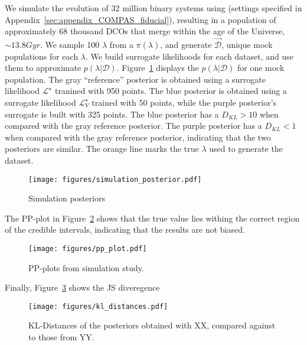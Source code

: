 \documentclass[twocolumn]{aastex631}
\begin{document}
We simulate the evolution of 32 million binary systems using \COMPAS (settings specified in Appendix~\ref{sec:appendix_COMPAS_fiducial}), resulting in a population of approximately 68 thousand DCOs that merge within the age of the Universe, $\sim13.8\unit{Gyr}$. 
We sample 100 $\lambda$ from a $\pi(\lambda)$, and generate $\vec{\mathcal{D}}$, unique mock \COMPAS populations for each $\lambda$.
We build surrogate likelihoods for each dataset, and use them to approximate $p(\lambda|\mathcal{D})$.
Figure~\ref{fig:simulation_posterior} displays the $p(\lambda|\mathcal{D})$ for one mock population.
The gray ``reference'' posterior is obtained using a surrogate likelihood $\mathcal{L}^{\star}$ tranined with 950 points.
The blue posterior is obtained using a surrogate likelihood $\mathcal{L}^{\star}_V$ trained with 50 points, while the purple posterior's surrogate is built with 325 points. 
The blue posterior has a $D_{KL}>10$ when compared with the gray reference posterior. 
The purple  posterior has a $D_{KL}<1$ when compared with the gray reference posterior, indicating that the two posteriors are similar. 
The orange line marks the true $\lambda$ used to generate the dataset. 
\begin{figure}[ht!]
    \begin{centering}
        \texttt{[image: figures/simulation\_posterior.pdf]}
        \caption{
            Simulation posteriors
        }
        \label{fig:simulation_posterior}
    \end{centering}
\end{figure}


The PP-plot in Figure~\ref{fig:pp_plot} shows that the true value lies withing the correct region of the credible intervals, indicating that the results are not biased.
\begin{figure}[ht!]
    \begin{centering}
        \texttt{[image: figures/pp\_plot.pdf]}
        \caption{
            PP-plots from simulation study.
        }
        \label{fig:pp_plot}
    \end{centering}
\end{figure}


Finally, Figure~\ref{fig:kl_distances} shows the JS diveregence 

\begin{figure}[ht!]
    \begin{centering}
        \texttt{[image: figures/kl\_distances.pdf]}
        \caption{
            KL-Distances of the posteriors obtained with XX, compared against to those from YY.
        }
        \label{fig:kl_distances}
    \end{centering}
\end{figure}
\end{document}
